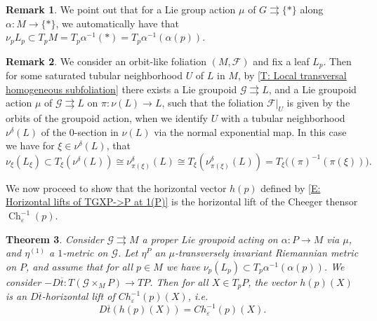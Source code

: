 \documentclass[12pt,a4paper,reqno]{amsart}
\DeclareMathOperator{\Ch}{Ch}
\newcommand{\1}{\mathbbm{1}} %
\newcommand{\fol}{\mathcal{F}} %
\newcommand{\G}{\mathcal{G}} %
\newtheorem{thm}{Theorem}[section]
\theoremstyle{definition}
\newtheorem{remark}[thm]{Remark}
\theoremstyle{TheoremNum}
\begin{document}
\begin{remark}
We point out that for a Lie group action $\mu$ of  $G\rightrightarrows\{\ast\}$ along $\alpha\colon M\to\{\ast\}$, we automatically have that $\nu_p L_p \subset T_p M = T_p \alpha^{-1}(\ast) = T_p \alpha^{-1}(\alpha(p))$. 
\end{remark}

\begin{remark}
We consider an orbit-like foliation $(M,\fol)$ and fix a leaf $L_p$. Then for some saturated tubular neighborhood $U$ of $L$ in $M$, by \th\ref{T: Local transversal homogeneous subfoliation} there exists a Lie groupoid $\G\rightrightarrows L$, and a Lie groupoid action $\mu$ of $\G\rightrightarrows L$ on $\pi\colon \nu(L)\to L$, such that the foliation $\fol|_{U}$ is given by the orbits of the groupoid action, when we identify $U$ with a tubular neighborhood $\nu^\delta (L)$ of the $0$-section in $\nu(L)$ via the normal exponential map. In this case we have  for $\xi\in \nu^\delta(L)$, that
\[
\nu_{\xi}(L_\xi)\subset  T_\xi(\nu^\delta(L)) \cong \nu^\delta_{\pi(\xi)}(L)\cong T_\xi(\nu^\delta_{\pi(\xi)}(L)) = T_\xi \Big((\pi)^{-1}(\pi(\xi))\Big).
\]
\end{remark}


We now proceed to show that the horizontal vector $h(p)$ defined by \eqref{E: Horizontal lifts of TGXP->P at 1(P)} is the horizontal lift of the Cheeger thensor $\Ch^{-1}_\varepsilon(p)$.

\begin{thm}\th\label{T: h is horizontal lift of cheeger}
Consider $\G\rightrightarrows M$ a proper Lie groupoid acting on $\alpha\colon P\to M$ via $\mu$, and $\eta^{(1)}$ a $1$-metric  on $\G$. Let $\eta^P$ an $\mu$-transversely invariant Riemannian metric on $P$, and assume that for all $p\in M$ we have $\nu_p (L_p)\subset T_p \alpha^{-1}(\alpha(p))$. We consider $-D\overline{t}\colon T(\G\times_M P)\to TP$. Then for all $X\in T_p P$, the vector $h(p)(X)$ is an $D\overline{t}$-horizontal lift of $Ch^{-1}_\varepsilon(p)(X)$, i.e.
\[
D\overline{t}(h(p)(X)) = Ch^{-1}_\varepsilon(p)(X).
\]
\end{thm}
\end{document}
